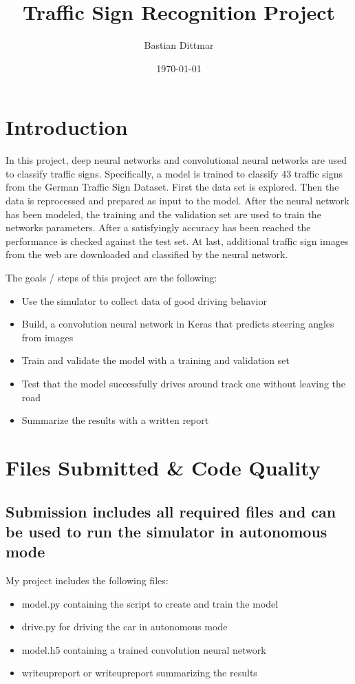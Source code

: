 \documentclass[a4paper, 11pt, DIV=14]{scrartcl}
\author{Bastian Dittmar}
\date{\today}
\title{Traffic Sign Recognition Project}
\begin{document}
\maketitle


\section{Introduction}
In this project, deep neural networks and convolutional neural networks are used to classify traffic signs. Specifically, a model is trained to classify 43 traffic signs from the German Traffic Sign Dataset. First the data set is explored. Then the data is reprocessed and prepared as input to the model. After the neural network has been modeled, the training and the validation set are used to train the networks parameters. After a satisfyingly accuracy has been reached the performance is checked against the test set. At last, additional traffic sign images from the web are downloaded and classified by the neural network.

The goals / steps of this project are the following:
\begin{itemize}
\item Use the simulator to collect data of good driving behavior
\item Build, a convolution neural network in Keras that predicts steering angles from images
\item Train and validate the model with a training and validation set
\item Test that the model successfully drives around track one without leaving the road
\item Summarize the results with a written report
\end{itemize}


\section{Files Submitted \& Code Quality}

\subsection{Submission includes all required files and can be used to run the simulator in autonomous mode}

My project includes the following files:
\begin{itemize}
\item model.py containing the script to create and train the model
\item drive.py for driving the car in autonomous mode
\item model.h5 containing a trained convolution neural network
\item writeupreport or writeupreport summarizing the results
\end{itemize}
\end{document}
